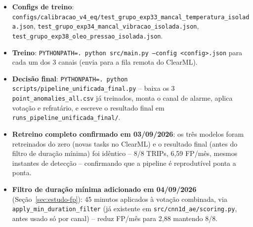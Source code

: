 \documentclass[11pt,a4paper]{article}
\begin{document}
\begin{itemize}
  \item \textbf{Configs de treino}:
    \texttt{configs/calibracao\_v4\_eq/test\_grupo\_exp33\_mancal\_temperatura\_isolada.json},
    \texttt{test\_grupo\_exp34\_mancal\_vibracao\_isolada.json},
    \texttt{test\_grupo\_exp38\_oleo\_pressao\_isolada.json}.
  \item \textbf{Treino}: \texttt{PYTHONPATH=. python src/main.py --config <config>.json}
    para cada um dos 3 canais (envia para a fila remota do ClearML).
  \item \textbf{Decisão final}: \texttt{PYTHONPATH=. python
    scripts/pipeline\_unificada\_final.py} -- baixa os 3
    \texttt{point\_anomalies\_all.csv} já treinados, monta o canal de
    alarme, aplica votação e refratário, e escreve o resultado final
    em \texttt{runs\_pipeline\_unificada\_final/}.
  \item \textbf{Retreino completo confirmado em 03/09/2026}: os três
    modelos foram retreinados do zero (novas tasks no ClearML) e o
    resultado final (antes do filtro de duração mínima) foi idêntico
    -- 8/8 TRIPs, 6,59 FP/mês, mesmos instantes de detecção --
    confirmando que a pipeline é reprodutível ponta a ponta.
  \item \textbf{Filtro de duração mínima adicionado em 04/09/2026}
    (Seção~\ref{sec:estudo-fp}): 45 minutos aplicados à votação
    combinada, via \texttt{apply\_min\_duration\_filter} (já existente
    em \texttt{src/cnn1d\_ae/scoring.py}, antes usado só por canal) --
    reduz FP/mês para 2,88 mantendo 8/8.
\end{itemize}
\end{document}

